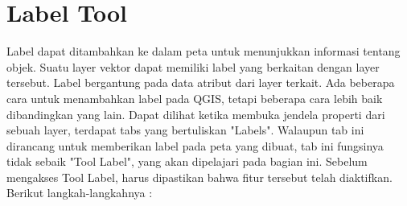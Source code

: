 \section{Label Tool}
Label dapat ditambahkan ke dalam peta untuk menunjukkan informasi tentang objek. Suatu layer vektor dapat memiliki label yang berkaitan dengan layer tersebut. Label bergantung pada data atribut dari layer terkait.
Ada beberapa cara untuk menambahkan label pada QGIS, tetapi beberapa cara lebih baik dibandingkan yang lain. Dapat dilihat ketika membuka jendela properti dari sebuah layer, terdapat tabs yang bertuliskan "Labels". Walaupun tab ini dirancang untuk memberikan label pada peta yang dibuat, tab ini fungsinya tidak sebaik "Tool Label", yang akan dipelajari pada bagian ini. Sebelum mengakses Tool Label, harus dipastikan bahwa fitur tersebut telah diaktifkan. Berikut langkah-langkahnya :
